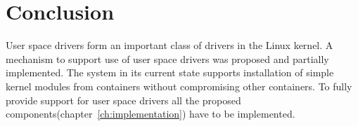 \documentclass[twoside]{iitbreport}
\begin{document}
\chapter{Conclusion}
User space drivers form an important class of drivers in the Linux kernel.
A mechanism to support use of user space drivers was proposed and partially implemented. The system in its current state supports installation of simple kernel modules from containers without compromising other containers. To fully provide support for user space drivers all the proposed components(chapter~\ref{ch:implementation}) have to be implemented.
\nocite{*}


\end{document}
